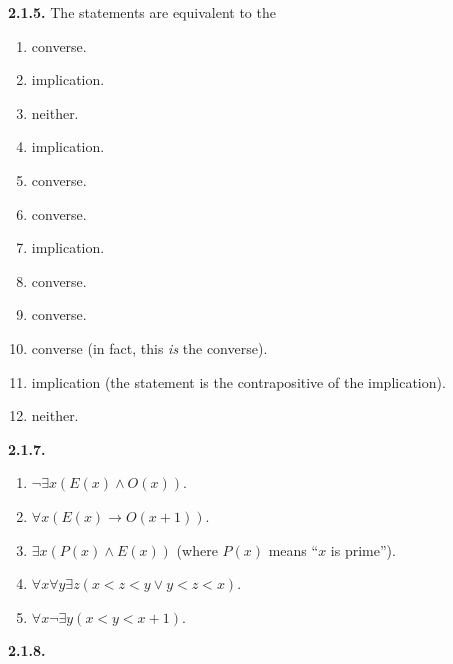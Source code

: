 \documentclass[12pt,]{book}
\theoremstyle{plain}
\theoremstyle{definition}
\theoremstyle{definition}
\theoremstyle{definition}
\numberwithin{equation}{chapter}
\newcommand{\imp}{\rightarrow}
\newcommand{\lt}{<}
\begin{document}
%
\par\smallskip
\noindent\textbf{2.1.5.} \hypertarget{p-1163}{}%
The statements are equivalent to the\textellipsis{} \leavevmode%
\begin{enumerate}[label=(\alph*)]
\item\hypertarget{li-577}{}\hypertarget{p-1164}{}%
converse.%
\item\hypertarget{li-578}{}\hypertarget{p-1165}{}%
implication.%
\item\hypertarget{li-579}{}\hypertarget{p-1166}{}%
neither.%
\item\hypertarget{li-580}{}\hypertarget{p-1167}{}%
implication.%
\item\hypertarget{li-581}{}\hypertarget{p-1168}{}%
converse.%
\item\hypertarget{li-582}{}\hypertarget{p-1169}{}%
converse.%
\item\hypertarget{li-583}{}\hypertarget{p-1170}{}%
implication.%
\item\hypertarget{li-584}{}\hypertarget{p-1171}{}%
converse.%
\item\hypertarget{li-585}{}\hypertarget{p-1172}{}%
converse.%
\item\hypertarget{li-586}{}\hypertarget{p-1173}{}%
converse (in fact, this \emph{is} the converse).%
\item\hypertarget{li-587}{}\hypertarget{p-1174}{}%
implication (the statement is the contrapositive of the implication).%
\item\hypertarget{li-588}{}\hypertarget{p-1175}{}%
neither.%
\end{enumerate}
%
\par\smallskip
\noindent\textbf{2.1.7.} \hypertarget{p-1184}{}%
\leavevmode%
\begin{enumerate}[label=(\alph*)]
\item\hypertarget{li-594}{}\(\neg \exists x (E(x) \wedge O(x))\).%
\item\hypertarget{li-595}{}\(\forall x (E(x) \imp O(x+1))\).%
\item\hypertarget{li-596}{}\(\exists x(P(x) \wedge E(x))\) (where \(P(x)\) means ``\(x\) is prime'').%
\item\hypertarget{li-597}{}\(\forall x \forall y \exists z(x \lt  z \lt  y \vee y \lt  z \lt  x)\).%
\item\hypertarget{li-598}{}\(\forall x \neg \exists y (x \lt  y \lt  x+1)\).%
\end{enumerate}
%
\par\smallskip
\noindent\textbf{2.1.8.} \hypertarget{p-1186}{}%
\leavevmode%
\end{document}
